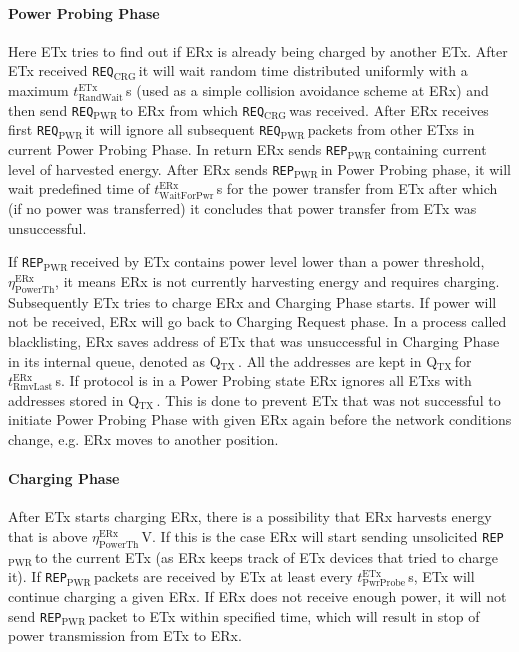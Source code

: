 \documentclass[11pt,draftclsnofoot,journal,onecolumn]{IEEEtran}
\newcommand{\textsubscript}[1]{$_{\text{#1}}$}
\newcommand{\txTimeoutProbeReceive}{$t^\text{ETx}_\text{PwrProbe}$}
\newcommand{\txRandomWaitTimeMax}{$t^\text{ETx}_\text{RandWait}$}
\newcommand{\rxDelayRemoveLastProbeSender}{$t^\text{ERx}_\text{RmvLast}$}
\newcommand{\rxDelayWaitingForPower}{$t^\text{ERx}_\text{WaitForPwr}$}
\newcommand{\rxVoltageThreshold}{$\eta^\text{ERx}_\text{PowerTh}$}
\newcommand{\chargingRequest}{\texttt{REQ\textsubscript{CRG}}\,}
\newcommand{\powerProbeReport}{\texttt{REP\textsubscript{PWR}}\,}
\newcommand{\powerProbeRequest}{\texttt{REQ\textsubscript{PWR}}\,}
\newcommand{\txAddressQueue}{Q\textsubscript{TX}\,}
\begin{document}
\paragraph{Power Probing Phase} Here ETx tries to find out if ERx is already being charged by another ETx. After ETx received \chargingRequest it will wait random time distributed uniformly with a maximum \txRandomWaitTimeMax\,s (used as a simple collision avoidance scheme at ERx) and then send \powerProbeRequest to ERx from which \chargingRequest was received. After ERx receives first \powerProbeRequest it will ignore all subsequent \powerProbeRequest packets from other ETxs in current Power Probing Phase. In return ERx sends \powerProbeReport containing current level of harvested energy. After ERx sends \powerProbeReport in Power Probing phase, it will wait predefined time of \rxDelayWaitingForPower\,s for the power transfer from ETx after which (if no power was transferred) it concludes that power transfer from ETx was unsuccessful.

If \powerProbeReport received by ETx contains power level lower than a power threshold, \rxVoltageThreshold, it means ERx is not currently harvesting energy and requires charging. Subsequently ETx tries to charge ERx and Charging Phase starts. If power will not be received, ERx will go back to Charging Request phase. In a process called blacklisting, ERx saves address of ETx that was unsuccessful in Charging Phase in its internal queue, denoted as \txAddressQueue. All the addresses are kept in \txAddressQueue for \rxDelayRemoveLastProbeSender\,s. If protocol is in a Power Probing state ERx ignores all ETxs with addresses stored in \txAddressQueue. This is done to prevent ETx that was not successful to initiate Power Probing Phase with given ERx again before the network conditions change, e.g. ERx moves to another position.

\paragraph{Charging Phase} After ETx starts charging ERx, there is a possibility that ERx harvests energy that is above \rxVoltageThreshold\,V. If this is the case ERx will start sending unsolicited \powerProbeReport to the current ETx (as ERx keeps track of ETx devices that tried to charge it). If \powerProbeReport packets are received by ETx at least every \txTimeoutProbeReceive\,s, ETx will continue charging a given ERx. If ERx does not receive enough power, it will not send \powerProbeReport packet to ETx within specified time, which will result in stop of power transmission from ETx to ERx.
\end{document}
